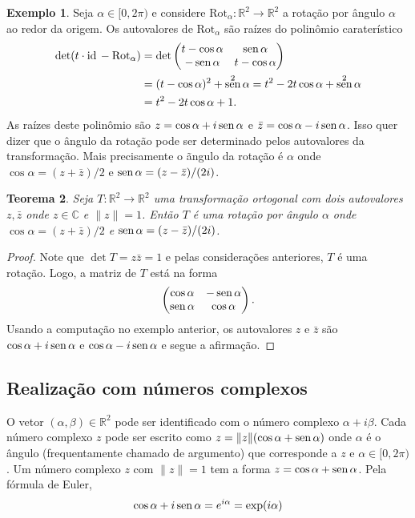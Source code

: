 \documentclass[12pt]{amsart}
\newcommand{\C}{\mathbb C}
\newcommand{\R}{\mathbb R}
\newcommand{\id}{\mbox{id}\,}
\DeclareMathOperator{\sen}{\textrm{\rm sen}}
\newcommand{\rot}[1]{{\textrm{Rot}}_{#1}}
\newtheorem{theorem}{Teorema}
\theoremstyle{definition}
\newtheorem{example}[theorem]{Exemplo}
\begin{document}
\begin{example}
    Seja $\alpha\in[0,2\pi)$ e considere $\rot \alpha:\R^2\to\R^2$ a rotação por ângulo $\alpha$ ao redor 
    da origem. Os autovalores de $\rot\alpha$ são raízes do polinômio caraterístico
    \begin{align*}
        \det(t\cdot\id-\rot\alpha)&=\det\begin{pmatrix} t-\cos \alpha & \sen\alpha \\ -\sen\alpha &t-\cos\alpha
        \end{pmatrix}\\&=(t-\cos \alpha)^2+\sen^2\alpha=t^2-2t\cos\alpha +\sen^2\alpha\\&=
        t^2-2t\cos\alpha+1.
    \end{align*}
    As raízes deste polinômio são $z=\cos\alpha+i\sen\alpha$ e $\bar z=\cos\alpha-i\sen\alpha$.
    Isso quer dizer que o ângulo da rotação pode ser determinado pelos autovalores da transformação. Mais 
    precisamente o ãngulo da rotação é $\alpha$ onde $\cos\alpha = (z+\bar z)/2$ e 
    $\sen\alpha=(z-\bar z)/(2i)$. 
 \end{example}

 \begin{theorem}\label{th:recog}
    Seja $T:\R^2\to\R^2$ uma transformação ortogonal com dois autovalores $z,\bar z$ onde $z\in\C$ e $\|z\|=1$. 
    Então $T$ é uma rotação por ângulo $\alpha$  onde $\cos\alpha=(z+\bar z)/2$ e $\sen\alpha=(z-\bar z)/(2i)$. 
 \end{theorem}
 \begin{proof}
    Note que $\det T=z\bar z=1$ e pelas considerações anteriores, $T$ é uma rotação. Logo, a matriz de $T$ 
    está na forma 
    \[
        \begin{pmatrix}\cos\alpha &-\sen\alpha \\ \sen\alpha & \cos \alpha\end{pmatrix}.
    \] 
    Usando a computação no exemplo anterior, os autovalores $z$ e  $\bar z$ são 
    $\cos\alpha+i\sen\alpha$ e $\cos\alpha-i\sen\alpha$ e segue a afirmação.
 \end{proof}


\subsection{Realização com números complexos}

O vetor $(\alpha,\beta)\in\R^2$ pode ser identificado com o número complexo $\alpha+i\beta$. 
Cada número complexo $z$ pode ser escrito como $z=\|z\|(\cos \alpha+\sen\alpha)$ onde $\alpha$ é o ângulo 
(frequentamente chamado de argumento) que corresponde a $z$ e $\alpha\in[0,2\pi)$. Um número complexo 
$z$ com $\|z\|=1$ tem a forma $z=\cos\alpha+\sen\alpha$. Pela fórmula de Euler, 
\[
    \cos\alpha+i\sen\alpha = e^{i\alpha}=\exp(i\alpha)
\]
\end{document}
